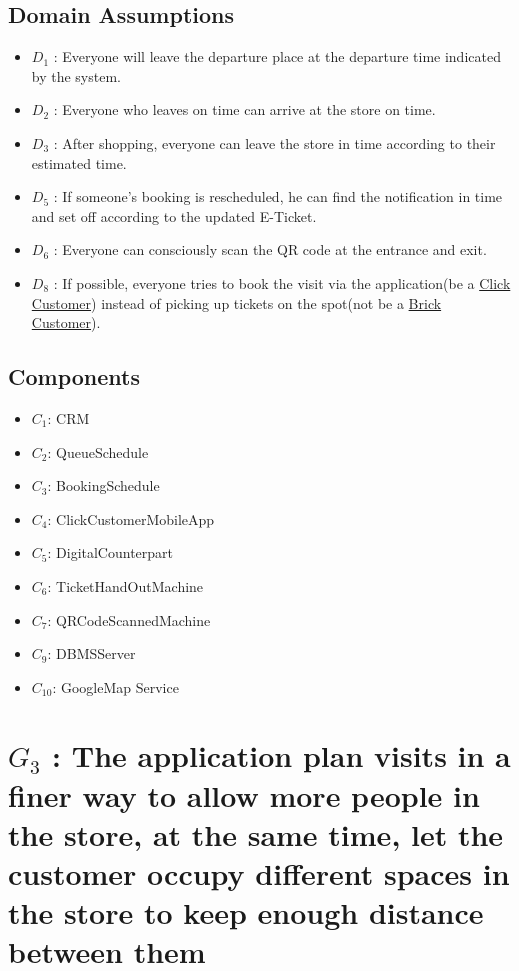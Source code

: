 \documentclass[a4paper,12pt]{report}
\begin{document}
\subsection{Domain Assumptions}

\begin{itemize}
	\item $D_1$ : Everyone will leave the departure place at the departure time indicated by the system.
	\item $D_2$ : Everyone who leaves on time can arrive at the store on time.
	\item $D_3$ : After shopping, everyone can leave the store in time according to their estimated time.
	\item $D_5$ : If someone's booking is rescheduled, he can find the notification in time and set off according to the updated E-Ticket.
	\item $D_6$ : Everyone can consciously scan the QR code at the entrance and exit.
	\item $D_8$ : If possible, everyone tries to book the visit via the application(be a \hyperref[Definitions]{Click Customer}) instead of picking up tickets on the spot(not be a \hyperref[Definitions]{Brick Customer}).
\end{itemize}


\subsection{Components}
\begin{itemize}
	\item $C_1$: CRM
	\item $C_2$: QueueSchedule
	\item $C_3$: BookingSchedule
	\item $C_4$: ClickCustomerMobileApp
	\item $C_5$: DigitalCounterpart
	\item $C_6$: TicketHandOutMachine
	\item $C_7$: QRCodeScannedMachine
	\item $C_{9}$: DBMSServer
	\item $C_{10}$: GoogleMap Service
\end{itemize}


\section{$G_3$ : The application plan visits in a finer way to allow more people in the store, at the same time, let the customer occupy different spaces in the store to keep enough distance between them}
\end{document}
